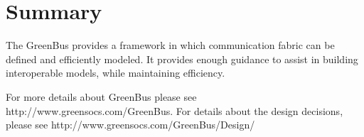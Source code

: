\documentclass[12pt,oneside]{gsbook}
\newcommand{\atom}{{\em Phase}\xspace}
\newcommand{\atoms}{{\em Phases}\xspace}
\begin{document}






\section{Summary}

The GreenBus provides a framework in which communication fabric can be defined and efficiently
modeled. It provides enough guidance to assist in building interoperable models, while maintaining
efficiency.

For more details about GreenBus please see http://www.greensocs.com/GreenBus.
For details about the design decisions, please see http://www.greensocs.com/GreenBus/Design/
\end{document}
